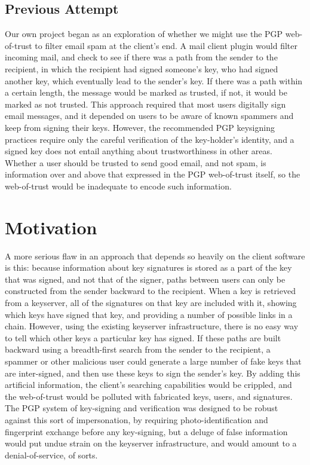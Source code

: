 \documentclass[onecolumn]{acm_proc_article-sp}
\begin{document}
\subsection{Previous Attempt}
Our own project began as an exploration of whether we might use the PGP web-of-trust to filter email spam at the client's end. A mail client plugin would filter incoming mail, and check to see if there was a path from the sender to the recipient, in which the recipient had signed someone's key, who had signed another key, which eventually lead to the sender's key. If there was a path within a certain length, the message would be marked as trusted, if not, it would be marked as not trusted. This approach required that most users digitally sign email messages, and it depended on users to be aware of known spammers and keep from signing their keys. However, the recommended PGP keysigning practices require only the careful verification of the key-holder's identity, and a signed key does not entail anything about trustworthiness in other areas.  Whether a user should be trusted to send good email, and not spam, is information over and above that expressed in the PGP web-of-trust itself, so the web-of-trust would be inadequate to encode such information.

\section{Motivation}
A more serious flaw in an approach that depends so heavily on the client software is this:  because information about key signatures is stored as a part of the key that was signed, and not that of the signer, paths between users can only be constructed from the sender backward to the recipient. When a key is retrieved from a keyserver, all of the signatures on that key are included with it, showing which keys have signed that key, and providing a number of possible links in a chain. However, using the existing keyserver infrastructure, there is no easy way to tell which other keys a particular key has signed. If these paths are built backward using a breadth-first search from the sender to the recipient, a spammer or other malicious user could generate a large number of fake keys that are inter-signed, and then use these keys to sign the sender's key. By adding this artificial information, the client's searching capabilities would be crippled, and the web-of-trust would be polluted with fabricated keys, users, and signatures. The PGP system of key-signing and verification was designed to be robust against this sort of impersonation, by requiring photo-identification and fingerprint exchange before any key-signing, but a deluge of false information would put undue strain on the keyserver infrastructure, and would amount to a denial-of-service, of sorts.
\end{document}
